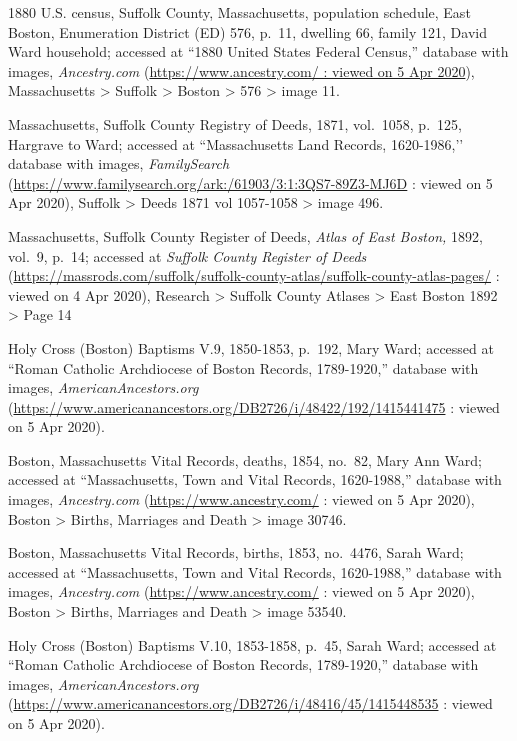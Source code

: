 \begin{thebibliography}{999}
	1880 U.S. census, Suffolk County, Massachusetts, population schedule, East Boston, Enumeration District (ED) 576, p.\ 11, dwelling 66, family 121, David Ward household; accessed at ``1880 United States Federal Census,'' database with images, \textit{Ancestry.com} (\url{https://www.ancestry.com/ : viewed on 5 Apr 2020}), Massachusetts > Suffolk > Boston > 576 > image 11.
	
	Massachusetts, Suffolk County Registry of Deeds, 1871, vol.\ 1058, p.\ 125, Hargrave to Ward; accessed at ``Massachusetts Land Records, 1620-1986,’’ database with images, \textit{FamilySearch} (\url{https://www.familysearch.org/ark:/61903/3:1:3QS7-89Z3-MJ6D} : viewed on 5 Apr 2020), Suffolk > Deeds 1871 vol 1057-1058 > image 496.
	
	Massachusetts, Suffolk County Register of Deeds, \textit{Atlas of East Boston,} 1892, vol.\ 9, p.\ 14; accessed at \textit{Suffolk County Register of Deeds} (\url{https://massrods.com/suffolk/suffolk-county-atlas/suffolk-county-atlas-pages/} : viewed on 4 Apr 2020), Research > Suffolk County Atlases > East Boston 1892 > Page 14
	
	Holy Cross (Boston) Baptisms V.9, 1850-1853, p.\ 192, Mary Ward; accessed at ``Roman Catholic Archdiocese of Boston Records, 1789-1920,'' database with images, \textit{AmericanAncestors.org} (\url{https://www.americanancestors.org/DB2726/i/48422/192/1415441475} : viewed on 5 Apr 2020).	
	
	Boston, Massachusetts Vital Records, deaths, 1854, no.\ 82, Mary Ann Ward; accessed at ``Massachusetts, Town and Vital Records, 1620-1988,'' database with images, \textit{Ancestry.com} (\url{https://www.ancestry.com/} : viewed on 5 Apr 2020), Boston > Births, Marriages and Death > image 30746.
	
	Boston, Massachusetts Vital Records, births, 1853, no.\ 4476, Sarah Ward; accessed at ``Massachusetts, Town and Vital Records, 1620-1988,'' database with images, \textit{Ancestry.com} (\url{https://www.ancestry.com/} : viewed on 5 Apr 2020), Boston > Births, Marriages and Death > image 53540.
	
	Holy Cross (Boston) Baptisms V.10, 1853-1858, p.\ 45, Sarah Ward; accessed at ``Roman Catholic Archdiocese of Boston Records, 1789-1920,'' database with images, \textit{AmericanAncestors.org} (\url{https://www.americanancestors.org/DB2726/i/48416/45/1415448535} : viewed on 5 Apr 2020).	
	

\end{thebibliography}
